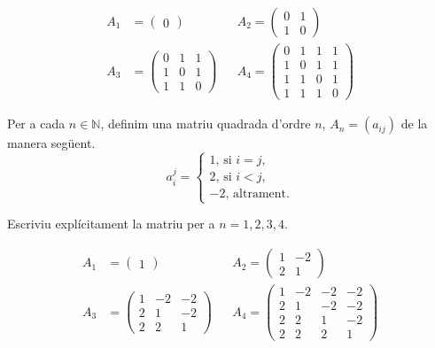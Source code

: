 \begin{solution}
    \begin{align}
        A_1 &= \begin{pmatrix}
        0
        \end{pmatrix}  
        &&A_2 = \begin{pmatrix}
        0 & 1 \\
        1 &0 
        \end{pmatrix} \\
        A_3 &= \begin{pmatrix}
        0 & 1 & 1\\
        1 &0 & 1\\
        1 & 1 & 0 
        \end{pmatrix} 
        &&A_4 = \begin{pmatrix}
        0 & 1 & 1 & 1\\
        1 &0 & 1 & 1\\
        1 & 1 & 0  &1\\
        1 & 1 & 1 & 0 
    \end{pmatrix} 
    \end{align}
\end{solution}

\begin{exercise}[1.8.4]
Per a cada $n\in\mathbb{N}$, definim una matriu quadrada d'ordre $n$, $A_n=(a_{ij})$ de la manera següent.
\begin{equation}
    a^j_i = \left\{\begin{aligned}
        1\text{, si } i=j,\\
        2\text{, si } i < j,\\
        -2\text{, altrament.}
    \end{aligned}
    \right.
\end{equation}

Escriviu explícitament la matriu per a $n=1,2,3,4$.
\end{exercise}

\begin{solution}
    \begin{align}
        A_1 &= \begin{pmatrix}
        1
        \end{pmatrix}  
        &&A_2 = \begin{pmatrix}
        1 & -2 \\
        2 &1 
        \end{pmatrix} \\
        A_3 &= \begin{pmatrix}
        1 & -2 & -2\\
        2&1 & -2\\
        2 & 2 & 1 
        \end{pmatrix} 
        &&A_4 = \begin{pmatrix}
        1 & -2 & -2 & -2\\
        2 &1 & -2& -2\\
        2 & 2 & 1  &-2\\
        2 & 2 & 2 & 1 
    \end{pmatrix} 
    \end{align}
\end{solution}


